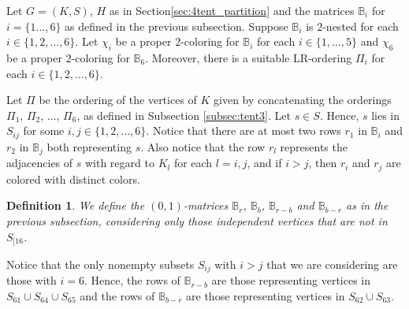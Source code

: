 \documentclass[12pt]{book}
\theoremstyle{plain}
\newtheorem{defn}[teo]{Definition}
\theoremstyle{remark}
\begin{document}

Let $G= (K,S)$, $H$ as in Section\ref{sec:4tent_partition} and the matrices $\mathbb B_i$ for $i= \{1 \ldots, 6\}$ as defined in the previous subsection.
Suppose $\mathbb B_i$ is $2$-nested for each $i \in \{1, 2, \ldots, 6\}$. Let $\chi_i$ be a proper $2$-coloring for $\mathbb B_i$ for each $i \in \{1, \ldots, 5\}$ and $\chi_6$ be a proper $2$-coloring for $\mathbb B_6$. Moreover, there is a suitable LR-ordering $\Pi_i$ for each $i \in \{1, 2, \ldots, 6\}$.

Let $\Pi$ be the ordering of the vertices of $K$ given by concatenating the orderings $\Pi_1$, $\Pi_2$, $\ldots$, $\Pi_6$, as defined in Subsection \ref{subsec:tent3}.
Let $s \in S$. Hence, $s$ lies in $S_{ij}$ for some $i,j\in \{1,2,\ldots,6\}$. 
Notice that there are at most two rows $r_1$ in $\mathbb B_i$ and $r_2$ in $\mathbb B_j$ both representing $s$. Also notice that the row $r_l$ represents the adjacencies of $s$ with regard to $K_l$ for each $l=i,j$, and if $i>j$, then $r_i$ and $r_j$ are colored with distinct colors.

\begin{defn} \label{def:matrices_B_por_colores}
We define the $(0,1)$-matrices $\mathbb B_r$, $\mathbb{B}_b$, $\mathbb B_{r-b}$ and $\mathbb B_{b-r}$ as in the previous subsection, considering only those independent vertices that are not in $S_{[16}$.
\end{defn}





Notice that the only nonempty subsets $S_{ij}$ with $i>j$ that we are considering are those with $i=6$. Hence, the rows of $\mathbb B_{r-b}$ are those representing vertices in $S_{61} \cup S_{64} \cup S_{65}$ and the rows of $\mathbb B_{b-r}$ are those representing vertices in $S_{62} \cup S_{63}$.
\end{document}
